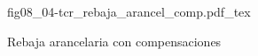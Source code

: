 \begin{figure}[h]
\centering
\def\svgwidth{0.5\textwidth}
{fig08_04-tcr_rebaja_arancel_comp.pdf_tex}
\caption{Rebaja arancelaria con compensaciones}
\label{fig08_04-tcr_rebaja_arancel_comp}
\end{figure}